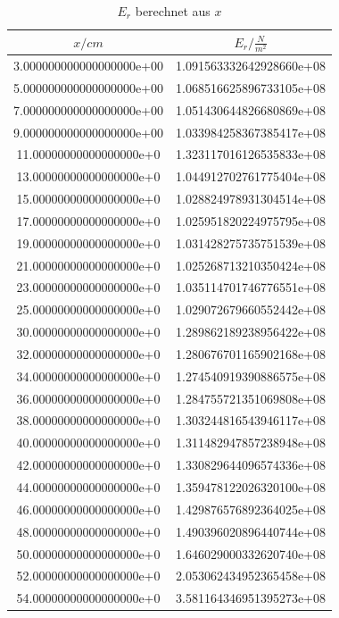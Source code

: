 \begin{table}
  \centering
  \caption{$E_{r}$ berechnet aus $x$}
  \label{tab:Erb}
  \begin{tabular}{S S}
    \toprule
    {$x/cm$} & {$E_r/\frac{N}{m^2}$}\\
    \midrule
    3.000000000000000000e+00 & 1.091563332642928660e+08\\
    5.000000000000000000e+00 & 1.068516625896733105e+08\\
    7.000000000000000000e+00 & 1.051430644826680869e+08\\
    9.000000000000000000e+00 & 1.033984258367385417e+08\\
    11.00000000000000000e+0 & 1.323117016126535833e+08\\
    13.00000000000000000e+0 & 1.044912702761775404e+08\\
    15.00000000000000000e+0 & 1.028824978931304514e+08\\
    17.00000000000000000e+0 & 1.025951820224975795e+08\\
    19.00000000000000000e+0 & 1.031428275735751539e+08\\
    21.00000000000000000e+0 & 1.025268713210350424e+08\\
    23.00000000000000000e+0 & 1.035114701746776551e+08\\
    25.00000000000000000e+0 & 1.029072679660552442e+08\\
    30.00000000000000000e+0 & 1.289862189238956422e+08\\
    32.00000000000000000e+0 & 1.280676701165902168e+08\\
    34.00000000000000000e+0 & 1.274540919390886575e+08\\
    36.00000000000000000e+0 & 1.284755721351069808e+08\\
    38.00000000000000000e+0 & 1.303244816543946117e+08\\
    40.00000000000000000e+0 & 1.311482947857238948e+08\\
    42.00000000000000000e+0 & 1.330829644096574336e+08\\
    44.00000000000000000e+0 & 1.359478122026320100e+08\\
    46.00000000000000000e+0 & 1.429876576892364025e+08\\
    48.00000000000000000e+0 & 1.490396020896440744e+08\\
    50.00000000000000000e+0 & 1.646029000332620740e+08\\
    52.00000000000000000e+0 & 2.053062434952365458e+08\\
    54.00000000000000000e+0 & 3.581164346951395273e+08\\

    \bottomrule
  \end{tabular}
\end{table}


